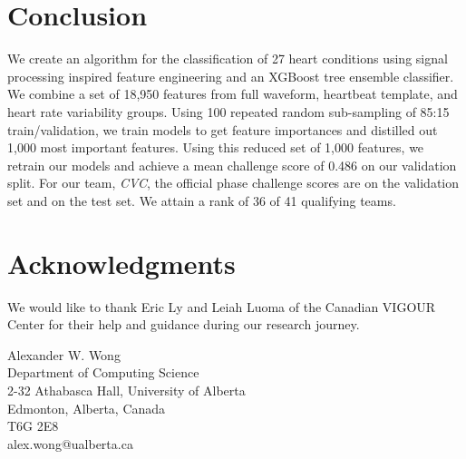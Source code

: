 \documentclass[twocolumn]{cinc}
\begin{document}
\section{Conclusion}

We create an algorithm for the classification of 27 heart conditions using signal processing inspired feature engineering and an XGBoost tree ensemble classifier.
We combine a set of 18,950 features from full waveform, heartbeat template, and heart rate variability groups.
Using 100 repeated random sub-sampling of 85:15 train/validation, we train models to get feature importances and distilled out 1,000 most important features.
Using this reduced set of 1,000 features, we retrain our models and achieve a mean challenge score of 0.486 on our validation split.
For our team, \emph{CVC}, the official phase challenge scores are \officialvalscore on the validation set and \officialtestscore on the test set.
We attain a rank of 36 of 41 qualifying teams.


\section*{Acknowledgments}
We would like to thank Eric Ly and Leiah Luoma of the Canadian VIGOUR Center for their help and guidance during our research journey.



\begin{correspondence}
Alexander W. Wong\\
Department of Computing Science\\
2-32 Athabasca Hall, University of Alberta\\
Edmonton, Alberta, Canada\\
T6G 2E8\\
alex.wong@ualberta.ca
\end{correspondence}
\end{document}
